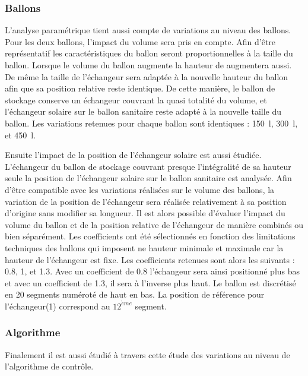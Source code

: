 \subsubsection{Ballons} %
\label{ssub:ballons}
L’analyse paramétrique tient aussi compte de variations au niveau des ballons.
Pour les deux ballons, l’impact du volume sera pris en compte. Afin d’être
représentatif les caractéristiques du ballon seront proportionnelles à la taille
du ballon. Lorsque le volume du ballon augmente la hauteur de augmentera aussi.
De même la taille de l’échangeur sera adaptée à la nouvelle hauteur du ballon
afin que sa position relative reste identique. De cette manière, le ballon de
stockage conserve un échangeur couvrant la quasi totalité du volume, et
l’échangeur solaire sur le ballon sanitaire reste adapté à la nouvelle taille du
ballon. Les variations retenues pour chaque ballon sont identiques :
\SI{150}{l}, \SI{300}{l}, et \SI{450}{l}.

Ensuite l’impact de la position de l’échangeur solaire est aussi étudiée. L’échangeur du
ballon de stockage couvrant presque l’intégralité de sa hauteur seule la position de
l’échangeur solaire sur le ballon sanitaire est analysée. Afin d’être compatible avec les
variations réalisées sur le volume des ballons, la variation de la position de l’échangeur
sera réalisée relativement à sa position d’origine sans modifier sa longueur. Il est alors
possible d’évaluer l’impact du volume du ballon et de la position relative de l’échangeur
de manière combinés ou bien séparément. Les coefficients ont été sélectionnés en fonction
des limitations techniques des ballons qui imposent ne hauteur minimale et maximale car la
hauteur de l’échangeur est fixe. Les coefficients retenues sont alors les suivants :
\num{0.8}, \num{1}, et \num{1.3}. Avec un coefficient de \num{0.8} l’échangeur sera ainsi
positionné plus bas et avec un coefficient de \num{1.3}, il sera à l’inverse plus haut.
Le ballon est discrétisé en \num{20} segments numéroté de haut en bas. La position de
référence pour l’échangeur(\num{1}) correspond au $12^{\grave eme}$ segment.


\subsubsection{Algorithme} %
\label{ssub:variations_algorithmiques}
Finalement il est aussi étudié à travers cette étude des variations au niveau
de l’algorithme de contrôle.

